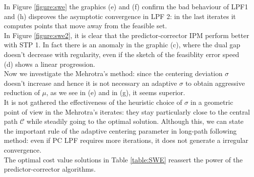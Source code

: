 \documentclass[a4paper,10 pt,titlepage,twoside]{book}
\theoremstyle{plain}
\theoremstyle{definition}
\theoremstyle{remark}
\begin{document}
In Figure \ref{figure:swe} the graphics (e) and (f) confirm the bad behaviour of LPF1 and (h) disproves the asymptotic convergence in LPF 2: in the last iterates it computes points that move away from the feasible set.\\
In Figure \ref{figure:swe2}, it is clear that the predictor-corrector IPM perform better with STP 1. In fact there is an anomaly in the graphic (c), where the dual gap doesn't decrease with regularity, even if the sketch of the feasiblity error speed (d) shows a linear progression. \\
Now we investigate the Mehrotra's method: since the centering deviation $\sigma$ doesn't increase and hence it is not necessary an adaptive $\sigma$ to obtain aggressive reduction of $\mu$, as we see in (e) and in (g), it seems superior.\\
It is not gathered the effectiveness of the heuristic choice of $\sigma$ in a geometric point of view in the Mehrotra's iterates: they stay particularly close to the central path $\mathcal{C}$ while steadily going to the optimal solution. 
Although this, we can state the important rule of the adaptive centering parameter in long-path following method: even if PC LPF requires more iterations, it does not generate a irregular convergence. \\The optimal cost value solutions in Table \ref{table:SWE} reassert the power of the predictor-corrector algorithms.   
\end{document}
